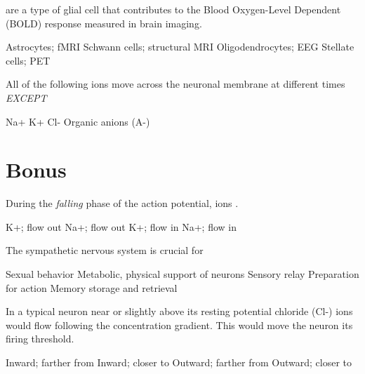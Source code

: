 \documentclass[answers]{exam}
\begin{document}
\begin{questions}
\question \fillin are a type of glial cell that contributes to the Blood Oxygen-Level Dependent (BOLD) response measured in \fillin brain imaging. 
\begin{choices}
\correctchoice Astrocytes; fMRI
\choice Schwann cells; structural MRI
\choice Oligodendrocytes; EEG
\choice Stellate cells; PET
\end{choices}

\newpage


\question All of the following ions move across the neuronal membrane at different times \emph{EXCEPT}
\begin{choices}
\choice Na+
\choice K+
\choice Cl-
\correctchoice Organic anions (A-)
\end{choices}

\section{Bonus}

\question During the \emph{falling} phase of the action potential, \fillin ions \fillin.
\begin{choices}
\correctchoice K+; flow out
\choice Na+; flow out
\choice K+; flow in
\choice Na+; flow in
\end{choices}

\question The sympathetic nervous system is crucial for
\begin{choices}
\choice Sexual behavior
\choice Metabolic, physical support of neurons
\choice Sensory relay
\correctchoice Preparation for action
\choice Memory storage and retrieval
\end{choices}



\question In a typical neuron near or slightly above its resting potential chloride (Cl-) ions would flow \fillin following the concentration gradient. This would move the neuron \fillin its firing threshold.
\begin{choices}
\correctchoice Inward; farther from
\choice Inward; closer to
\choice Outward; farther from
\choice Outward; closer to
\end{choices}


\end{questions}
\end{document}
